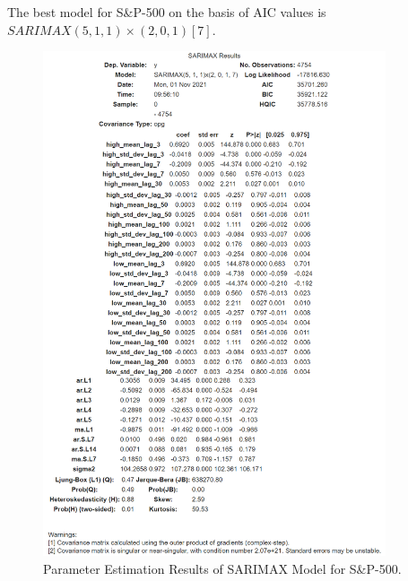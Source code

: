 \documentclass[conference]{IEEEtran}
\begin{document}
The best model for S\&P-500 on the basis of AIC values is $SARIMAX(5, 1, 1) \times (2, 0, 1)[7]$.

\begin{figure}[htbp]
    \centering
    \includegraphics[width = 0.90\textwidth]{images/S&P-500-Parameter-Estimation-Results.png}
    \caption{Parameter Estimation Results of SARIMAX Model for S\&P-500.}
    \label{fig:s_and_p_500_parameter_estimation_report}
\end{figure}
\end{document}
